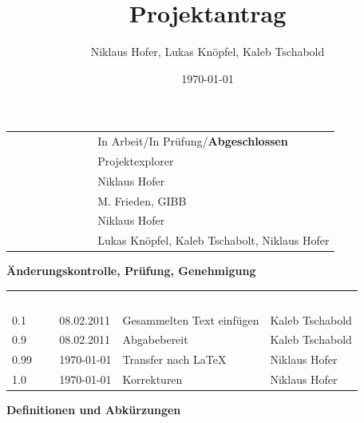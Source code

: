 \documentclass[10pt,paper=a4,final]{scrartcl}
\title{Projektantrag}
\author{Niklaus Hofer, Lukas Kn\"opfel, Kaleb Tschabold}
\date{\today}
\begin{document}
\maketitle
\newpage
\begin{tabularx}{\textwidth}{ r X }	%
\textcolor{white}{{\bf Status}}\cellcolor{blue!80!} & In Arbeit/In Prüfung/{\bf Abgeschlossen}\cellcolor{blue!20!} \\
\textcolor{white}{{\bf Projektname}}\cellcolor{blue!80!} & Projektexplorer\cellcolor{blue!20!} \\
\textcolor{white}{{\bf Projektleiter}}\cellcolor{blue!80!} & Niklaus Hofer\cellcolor{blue!20!} \\
\textcolor{white}{{\bf Auftraggeber}}\cellcolor{blue!80!} & M. Frieden, GIBB\cellcolor{blue!20!} \\
\textcolor{white}{{\bf Autoren}}\cellcolor{blue!80!} & Niklaus Hofer\cellcolor{blue!20!} \\
\textcolor{white}{{\bf Verteiler}}\cellcolor{blue!80!} & Lukas Knöpfel, Kaleb Tschabolt, Niklaus Hofer\cellcolor{blue!20!}
\end{tabularx}
\newline
\newline
\newline
{\bf Änderungskontrolle, Prüfung, Genehmigung}
\newline

\begin{tabularx}{\textwidth}{l l X X}
\textcolor{white}{Version}\cellcolor{blue!80!} & \textcolor{white}{Datum}\cellcolor{blue!80!} & \textcolor{white}{Beschreibung, Bemerkung}\cellcolor{blue!80!} & \textcolor{white}{Name oder Rolle}\cellcolor{blue!80!} \\
\cellcolor{blue!20!} 0.1& \cellcolor{blue!20!} 08.02.2011 & Gesammelten Text einfügen \cellcolor{blue!20!} & Kaleb Tschabold \cellcolor{blue!20!} \\
\cellcolor{blue!20!} 0.9& \cellcolor{blue!20!} 08.02.2011 & Abgabebereit \cellcolor{blue!20!} & Kaleb Tschabold \cellcolor{blue!20!} \\
\cellcolor{blue!20!} 0.99& \cellcolor{blue!20!} \today{} & Transfer nach \LaTeX \cellcolor{blue!20!} & Niklaus Hofer \cellcolor{blue!20!} \\
\cellcolor{blue!20!} 1.0& \cellcolor{blue!20!} \today{} & Korrekturen \cellcolor{blue!20!} & Niklaus Hofer \cellcolor{blue!20!} \\
\end{tabularx}
\newline
\newline
\newline
{\bf Definitionen und Abkürzungen}
\newline
\end{document}
